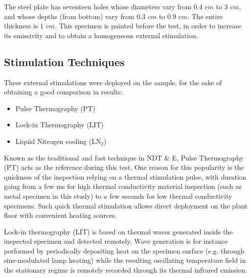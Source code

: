The steel plate has seventeen holes whose diameters vary from 0.4 $cm$  to 3 $cm$, and whose depths (from bottom) vary from 0.3 $cm$ to 0.9 $cm$. The entire thickness is 1 $cm$. This specimen is painted before the test, in order to increase its emissivity and to obtain a homogeneous external stimulation.

\subsection{Stimulation Techniques} %
\label{sub:stimulation_techniques}
Three external stimulations were deployed on the sample, for the sake of  obtaining a good comparison in results: 
\begin{itemize}
   \item Pulse Thermography (PT) 
   \item Lock-in Thermography (LIT)
   \item Liquid Nitrogen cooling (LN$_2$)
\end{itemize}
Known as the traditional and fast technique in NDT \& E, Pulse Thermography (PT) acts as the reference during this test. One reason for this popularity is the quickness of the inspection relying on a thermal  stimulation pulse, with duration going from a few ms for high thermal conductivity material inspection (such as metal specimen in this study) to a few seconds for low thermal conductivity specimens.  Such quick thermal stimulation allows direct deployment on the plant floor with convenient heating sources.


Lock-in thermography (LIT) is based on thermal waves generated inside the inspected specimen and detected remotely. Wave generation is for instance performed by periodically depositing heat on the specimen surface (e.g. through sine-modulated lamp heating) while the resulting oscillating temperature field in the stationary regime is remotely recorded through its thermal infrared emission.

